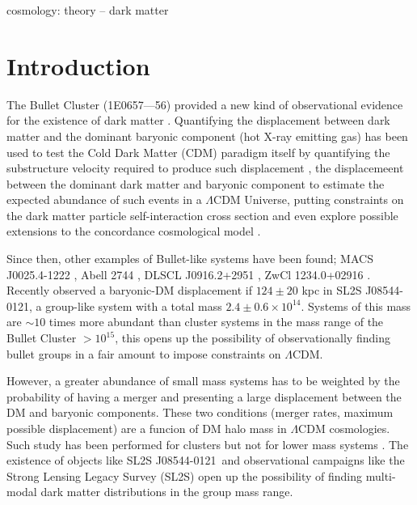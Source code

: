 \documentclass{emulateapj}
\newcommand{\hMsun}{{\ifmmode{h^{-1}{\rm {M_{\odot}}}}\else{$h^{-1}{\rm{M_{\odot}}}$}\fi}}
\newcommand{\Msun}{{\ifmmode{{\rm {M_{\odot}}}}\else{${\rm{M_{\odot}}}$}\fi}}
\newcommand{\bulla}{1E0657---56}
\newcommand{\bullg}{SL2S J08544-0121}
\begin{document}
\begin{keywords}
{cosmology: theory -- dark matter} 
\end{keywords}

\section{Introduction}


The Bullet Cluster (\bulla) provided a new kind of observational
evidence for the existence of dark matter
\citep{Markevitch2004,Clowe2006}. Quantifying the displacement between
dark matter and the dominant baryonic component (hot X-ray emitting gas)
has been used to test the Cold Dark Matter (CDM)
paradigm itself by quantifying the substructure velocity required to
produce such displacement \citep{Hayashi2006, Springel2007,
  Thompson2012}, the displacemeent between the dominant dark matter
and baryonic component \citep{ForeroRomero2010} to estimate the
expected abundance of such events in a $\Lambda$CDM Universe, putting
constraints on the dark matter particle self-interaction cross section
and even explore possible extensions to the concordance cosmological model
\citep{Farrar2007,Lee2010,Lee2012}.    


Since then, other examples of Bullet-like systems have been found; 
MACS J0025.4-1222 \citep{Bradac2008}, Abell 2744 \citep{Merten2011},
DLSCL J0916.2+2951 \citep{Dawson2012}, ZwCl 1234.0+02916
\citep{Dahle2013}. Recently \citep{Gastaldello} observed a baryonic-DM
displacement if $124\pm 20$ kpc in \bullg, a group-like system with a total
mass $2.4\pm 0.6 \times 10^{14}$\Msun. Systems of this mass are
$\sim10$ times more abundant than cluster systems in the mass range of
the Bullet Cluster $>10^{15}$\hMsun, this opens up the possibility of
observationally finding bullet groups in a fair amount to impose
constraints on $\Lambda$CDM. 


However, a greater abundance of small mass systems has to be weighted
by the probability of having a merger and 
presenting a large displacement between the DM and baryonic
components. These two conditions (merger rates, maximum possible
displacement) are a funcion of DM halo mass in $\Lambda$CDM
cosmologies.  Such study has been performed for clusters but not for
lower mass systems \citep{ForeroRomero2010}. The existence of objects
like \bullg\ and observational campaigns like the Strong Lensing Legacy
Survey (SL2S) \citep{Cabanac2007,More2012} open up the possibility of finding
multi-modal dark matter distributions in the group mass range. 
\end{document}
